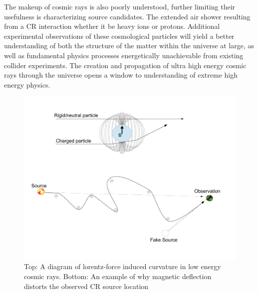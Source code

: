 	The makeup of cosmic rays is also poorly understood, further limiting their usefulness is characterizing source candidates.  The extended air shower resulting from a CR interaction whether it be heavy ions or protons.  Additional experimental observations of these cosmological particles will yield a better understanding of both the structure of the matter within the universe at large, as well as fundamental physics processes energetically unachievable from existing collider experiments.  The creation and propagation of ultra high energy cosmic rays through the universe opens a window to understanding of extreme high energy physics. \\

		
	

\noindent		
\begin{figure}
\label{fig:CosmicRayDeviation}
	\includegraphics[width=\textwidth]{figures/CosmicRayDeflection}
	\caption{Top: A diagram of lorentz-force induced curvature in low energy cosmic rays.  Bottom: An example of why magnetic deflection distorts the observed CR source location}
\end{figure}
		


